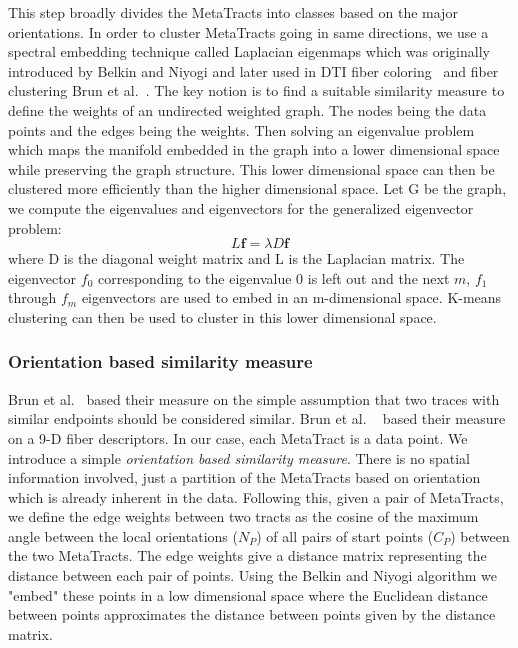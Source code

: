 This step broadly divides the MetaTracts into classes based on the major orientations.
In order to cluster MetaTracts going in same directions, we use a spectral embedding technique called Laplacian eigenmaps which was originally introduced by Belkin and Niyogi \cite{Belkin01} and later used in DTI fiber coloring~\cite{Brun2003} and fiber clustering Brun et al.~\cite{Brun2004}. The key notion is to find a suitable similarity measure to define the weights of an undirected weighted graph. The nodes being the data points and the edges being the weights. Then solving an eigenvalue problem which maps the manifold embedded in the graph into a lower dimensional space while preserving the graph structure.
This lower dimensional space can then be clustered more efficiently than the higher dimensional space. 
Let G be the graph, we compute the eigenvalues and eigenvectors for the generalized eigenvector problem:
\begin{equation}\label{equn:eigenMaps}
L\textbf{f}=\lambda D\textbf{f}
\end{equation}
where D is the diagonal weight matrix and L is the Laplacian matrix. The eigenvector \textbf{${f}_{0}$} corresponding to the eigenvalue 0 is left out and the next $m$, {\textbf{${f}_{1}$} through \textbf{${f}_{m}$}} eigenvectors are used to embed in an m-dimensional space. K-means clustering can then be used to cluster in this lower dimensional space.


\subsubsection{Orientation based similarity measure}
\label{subsec:ori-sim-mes}
Brun et al.~\cite{Brun2003} based their measure on the simple assumption that two traces with similar endpoints should 
be considered similar. Brun et al. ~\cite{Brun2004} based their measure on a 9-D fiber descriptors.
In our case, each MetaTract is a data point. We introduce a simple \textit{orientation based similarity measure}. There is no spatial information involved, just a partition of the MetaTracts based on orientation which is already inherent in the data.
Following this, given a pair of  MetaTracts, we define the edge weights between two tracts as the cosine of the maximum angle between the local orientations ($N_P$) of all pairs of start points ($C_P$) between the two MetaTracts.
The edge weights give a distance matrix representing the distance between each pair of points.
Using the Belkin and Niyogi algorithm we "embed" these points in a low dimensional space where the Euclidean distance between points approximates the distance between points given by the distance matrix.

